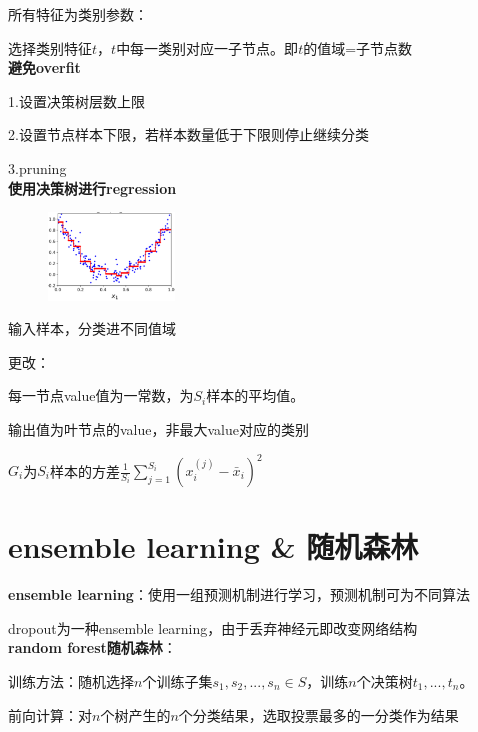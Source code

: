 \documentclass[UTF8]{ctexart}
\begin{document}
  所有特征为类别参数：
  
  \quad 选择类别特征$t$，$t$中每一类别对应一子节点。即$t$的值域=子节点数\\
\textbf{避免overfit}

  1.设置决策树层数上限

  2.设置节点样本下限，若样本数量低于下限则停止继续分类
  
  3.pruning\\
\textbf{使用决策树进行regression}

  \begin{figure}[H] %
    \centering %
    \includegraphics[width=0.3\textwidth]{note_images/deci_tree_regression.png} %
  \end{figure}

  输入样本，分类进不同值域

  更改：
  
  \quad 每一节点value值为一常数，为$S_i$样本的平均值。
  
  \quad 输出值为叶节点的value，非最大value对应的类别

  \quad $G_i$为$S_i$样本的方差$\frac{1}{S_i}\sum_{j=1}^{S_i}(x_i^{(j)} - \bar{x}_i)^2$

\section{ensemble learning \& 随机森林}
\noindent \textbf{ensemble learning}：使用一组预测机制进行学习，预测机制可为不同算法

  dropout为一种ensemble learning，由于丢弃神经元即改变网络结构\\
\textbf{random forest随机森林}：

  训练方法：随机选择$n$个训练子集$s_1, s_2, ..., s_n \in S$，训练$n$个决策树$t_1, ..., t_n$。
  
  前向计算：对$n$个树产生的$n$个分类结果，选取投票最多的一分类作为结果
  
\end{document}
